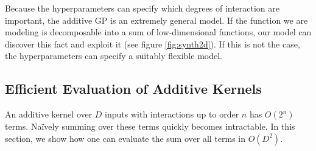 
Because the hyperparameters can specify which degrees of interaction are important, the additive GP is an extremely general model.  
  If the function we are modeling is decomposable into a sum of low-dimensional functions, our model can discover this fact and exploit it (see figure \ref{fig:synth2d}).
If this is not the case, the hyperparameters can specify a suitably flexible model.









\subsection{Efficient Evaluation of Additive Kernels}
An additive kernel over $D$ inputs with interactions up to order $n$ has $O(2^n)$ terms.
Na\"{i}vely summing over these terms quickly becomes intractable.
In this section, we show how one can evaluate the sum over all terms in $O(D^2)$.

